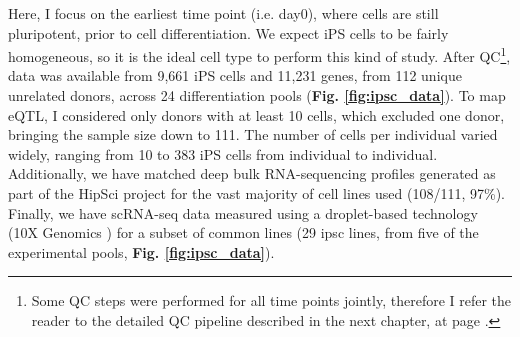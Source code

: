 Here,
I focus on the earliest time point (i.e. day0), where cells are still pluripotent, prior to cell differentiation.
We expect iPS cells to be fairly homogeneous, so it is the ideal cell type to perform this kind of study.
After QC\footnote{Some QC steps were performed for all time points jointly, therefore I refer the reader to the detailed QC pipeline described in the next chapter, at page \pageref{fig:endodiff_qc_workflow}.}, data was available from 9,661 iPS cells and 11,231 genes, from 112 unique unrelated donors, across 24 differentiation pools (\textbf{Fig. \ref{fig:ipsc_data}}). 
To map eQTL, I considered only donors with at least 10 cells, which excluded one donor, bringing the sample size down to 111.
The number of cells per individual varied widely, ranging from 10 to 383 iPS cells from individual to individual.
Additionally, we have matched deep bulk RNA-sequencing profiles generated as part of the HipSci project \cite{kilpinen2017common} for the vast majority of cell lines used (108/111, 97\%). 
Finally, we have scRNA-seq data measured using a droplet-based technology (10X Genomics \cite{zheng2017massively}) for a subset of common lines (29 \gls{ipsc} lines, from five of the experimental pools, \textbf{Fig. \ref{fig:ipsc_data}}). 

